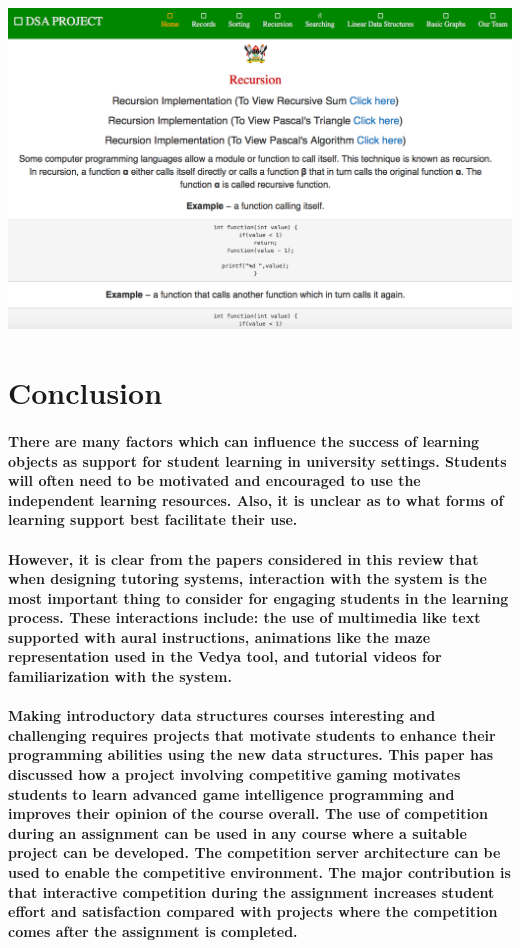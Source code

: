 \documentclass{article}
\begin{document}
\includegraphics[width=1.0\textwidth]{./recursion}\\[0.1in]





\section{Conclusion}  
\paragraph{There are many factors which can influence the success of learning objects as support for student learning in university settings. Students will often need to be motivated and encouraged to use the independent learning resources. Also, it is unclear as to what forms of learning support best facilitate their use. }

\paragraph{\cite{de2006can}However, it is clear from the papers considered in this review that when designing tutoring systems, interaction with the system is the most important thing to consider for engaging students in the learning process. These interactions include: the use of multimedia like text supported with aural instructions, animations like the maze representation used in the Vedya tool, and tutorial videos for familiarization with the system.}

\paragraph{Making introductory data structures courses interesting and challenging requires projects that motivate students to enhance their programming abilities using the new data structures. This paper has discussed how a project involving competitive gaming motivates students to learn advanced game intelligence programming and improves their opinion of the course overall. The use of competition during an assignment can be used in any course where a suitable project can be developed. The competition server architecture can be used to enable the competitive environment. The major contribution is that interactive competition during the assignment increases student effort and satisfaction compared with projects where the competition comes after the assignment is completed.}
\end{document}
